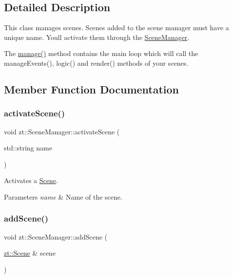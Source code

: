 \subsection{Detailed Description}
This class manages scenes. Scenes added to the scene manager must have a unique name. You\textquotesingle{}ll activate them through the \hyperlink{classzt_1_1_scene_manager}{Scene\+Manager}. 

The \hyperlink{classzt_1_1_scene_manager_a9385d452cd66294db0c03b6366519d4a}{manage()} method contains the main loop which will call the manage\+Events(), logic() and render() methods of your scenes. 

\subsection{Member Function Documentation}
\mbox{\label{classzt_1_1_scene_manager_acee2eb38afb510f701dc3dd3c5fe3482}} 
\subsubsection{\texorpdfstring{activate\+Scene()}{activateScene()}}
{\footnotesize\ttfamily void zt\+::\+Scene\+Manager\+::activate\+Scene (\begin{DoxyParamCaption}\item[{std\+::string}]{name }\end{DoxyParamCaption})}



Activates a \hyperlink{classzt_1_1_scene}{Scene}. 


\begin{DoxyParams}{Parameters}
{\em name} & Name of the scene. \\
\hline
\end{DoxyParams}
\mbox{\label{classzt_1_1_scene_manager_a063202765a5b757eae0d28bb9badc53b}} 
\subsubsection{\texorpdfstring{add\+Scene()}{addScene()}}
{\footnotesize\ttfamily void zt\+::\+Scene\+Manager\+::add\+Scene (\begin{DoxyParamCaption}\item[{\hyperlink{classzt_1_1_scene}{zt\+::\+Scene} \&}]{scene }\end{DoxyParamCaption})}



